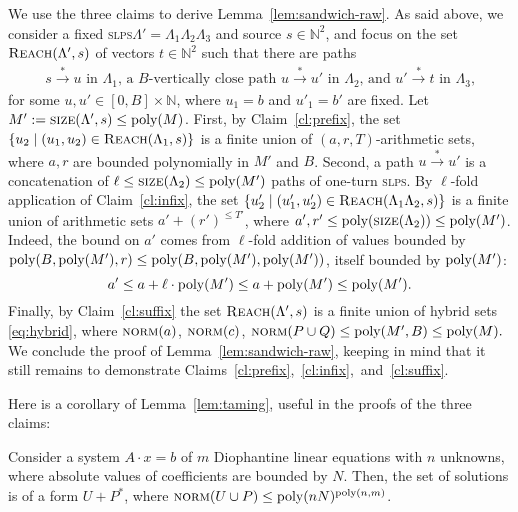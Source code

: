 \documentclass[a4paper, UKenglish, cleveref, autoref, thm-restate]{lipics-v2021}
\newcommand{\N}{\mathbb{N}}
\newcommand{\reach}{\textsc{Reach}}
\newcommand{\trans}[1]{\stackrel{#1}{\longrightarrow}}
\newcommand{\tran}{\trans{*}}
\newcommand{\slps}{\textsc{slps}\xspace}
\newcommand{\norm}{\textsc{norm}}
\newcommand{\size}{\textsc{size}}
\newcommand{\poly}{\textup{poly}}
\newcommand{\setfromto}[2]{[#1, #2]}
\begin{document}
\begin{appendixproof}
We use the three  claims to derive Lemma~\ref{lem:sandwich-raw}.
As said above,
we consider a fixed \slps $\Lambda' = \Lambda_1 \Lambda_2 \Lambda_3$ and source $s\in\N^2$,
and focus on the set $\reach(\Lambda', s)$ of vectors $t\in\N^2$ such that
there are paths 
\begin{align} \label{eq:paths}
\text{$s \tran u$ in $\Lambda_1$,  \ \  
a $B$-vertically close path $u \tran u'$ in $\Lambda_2$, \ \ 
and   $u'\tran t$ in $\Lambda_3$,}
\end{align}
for some $u,u'\in \setfromto 0 B \times \N$, where 
$u_1 = b$ and $u'_1 = b'$ are fixed.
Let $M':=\size(\Lambda',s) \leq \poly(M)$.
First, by Claim~\ref{cl:prefix}, the set
$\{u_2 \mid (u_1, u_2) \in \reach(\Lambda_1,s)\}$ is a finite union of $(a, r, T)$-arithmetic sets,
where $a, r$ are bounded polynomially in $M'$ and $B$.
Second,
a path $u\tran u'$ is a concatenation of $\ell\leq \size(\Lambda_2) \leq \poly(M')$
paths of one-turn \slps. 
By $\ell$-fold application of Claim~\ref{cl:infix}, the set
$\{u'_2 \mid (u'_1, u'_2) \in \reach(\Lambda_1 \Lambda_2,s)\}$
is a finite union of arithmetic sets
$a' + (r')^{\leq T'}$, where
$a', r' \leq \poly(\size(\Lambda_2)) \leq \poly(M')$.
Indeed, the bound on $a'$ comes from $\ell$-fold addition of values bounded by 
$\poly(B, \poly(M'), r)\leq \poly(B, \poly(M'), \poly(M'))$,
itself bounded by $\poly(M')$:
\begin{equation}\label{eq:aprim}
a' \leq a + \ell \cdot \poly(M') \leq a + \poly(M') \leq \poly(M').
\end{equation}
Finally, by Claim~\ref{cl:suffix} the set $\reach(\Lambda',s)$ is a finite union of hybrid sets \eqref{eq:hybrid},
where
$
\norm(a)$, $\norm(c)$, $\norm(P \cup Q) \leq \poly(M', B) \leq \poly(M).
$ 
We conclude the proof of Lemma~\ref{lem:sandwich-raw}, keeping in mind that
it still remains to demonstrate Claims~\ref{cl:prefix},~\ref{cl:infix},~and~\ref{cl:suffix}.

\medskip

Here is  a corollary of Lemma~\ref{lem:taming}, useful in the proofs of the three claims:
\begin{lemma}\label{lem:solutions}
Consider a system $A\cdot x = b$ of $m$ Diophantine linear equations with $n$ unknowns,
where absolute values of coefficients are bounded by $N$.
Then, the set of solutions is of a form $U+P^*$, where
$\norm(U \cup P) \leq \poly(nN)^{\poly(n,m)}$.
\end{lemma}


\end{appendixproof}
\end{document}
